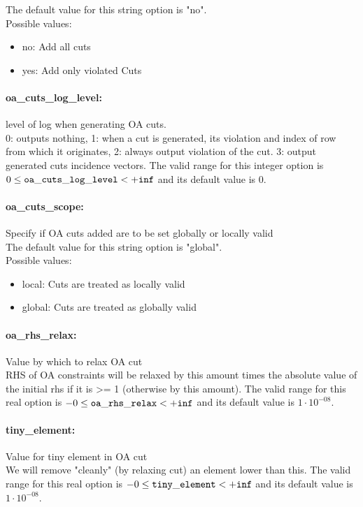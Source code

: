 The default value for this string option is "no".
\\ 
Possible values:
\begin{itemize}
   \item no: Add all cuts
   \item yes: Add only violated Cuts
\end{itemize}

\paragraph{oa\_cuts\_log\_level:}\label{sec:oa_cuts_log_level} level of log when generating OA cuts. $\;$ \\
 0: outputs nothing,
1: when a cut is generated,
its violation and index of row from which it
originates,
2: always output violation of the
cut.
3: output generated cuts incidence vectors. The valid range for this integer option is
$0 \le {\tt oa\_cuts\_log\_level } <  {\tt +inf}$
and its default value is $0$.


\paragraph{oa\_cuts\_scope:}\label{sec:oa_cuts_scope} Specify if OA cuts added are to be set globally or locally valid $\;$ \\

The default value for this string option is "global".
\\ 
Possible values:
\begin{itemize}
   \item local: Cuts are treated as locally valid
   \item global: Cuts are treated as globally valid
\end{itemize}

\paragraph{oa\_rhs\_relax:}\label{sec:oa_rhs_relax} Value by which to relax OA cut $\;$ \\
 RHS of OA constraints will be relaxed by this
amount times the absolute value of the initial
rhs if it is >= 1 (otherwise by this amount). The valid range for this real option is 
$-0 \le {\tt oa\_rhs\_relax } <  {\tt +inf}$
and its default value is $1 \cdot 10^{-08}$.


\paragraph{tiny\_element:}\label{sec:tiny_element} Value for tiny element in OA cut $\;$ \\
 We will remove "cleanly" (by relaxing cut) an
element lower than this. The valid range for this real option is 
$-0 \le {\tt tiny\_element } <  {\tt +inf}$
and its default value is $1 \cdot 10^{-08}$.


